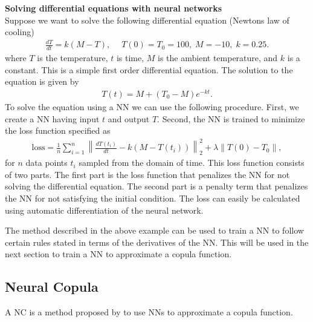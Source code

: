\begin{example}\label{ex:NeuralNetworkDifferentialEquation}
    \textbf{Solving differential equations with neural networks}\\
    Suppose we want to solve the following differential equation (Newtons law of cooling)
    \begin{align*}
        \frac{dT}{dt} = k(M-T), \quad \; T(0) = T_0 = 100,\; M = -10,\; k = 0.25.
    \end{align*}
    where $T$ is the temperature, $t$ is time, $M$ is the ambient temperature, and $k$ is a constant. This is a simple first order differential equation. The solution to the equation is given by
    \begin{align*}
        T(t) = M + (T_0-M)e^{-kt}.
    \end{align*}
    To solve the equation using a \gls{NN} we can use the following procedure. First, we create a \gls{NN} having input $t$ and output $T$. Second, the \gls{NN} is trained to minimize the loss function specified as 
    \begin{align*}
        \mathrm{loss} = \frac{1}{n} \sum_{i=1}^{n} \left\| \frac{dT(t_i)}{dt} - k(M-T(t_i))\right\|_2^2 + \lambda \left\|T(0) - T_0\right\|,
    \end{align*}
    for $n$ data points $t_i$ sampled from the domain of time. 
    This loss function consists of two parts. The first part is the loss function that penalizes the \gls{NN} for not solving the differential equation. The second part is a penalty term that penalizes the \gls{NN} for not satisfying the initial condition. The loss can easily be calculated using automatic differentiation of the neural network. 
\end{example}
The method described in the above example can be used to train a \gls{NN} to follow certain rules stated in terms of the derivatives of the \gls{NN}. This will be used in the next section to train a \gls{NN} to approximate a copula function.  


\subsection{Neural Copula}\label{sec:NeuralCopula}
A \gls{NC} is a method proposed by  to use \gls{NN}s to approximate a copula function. 


